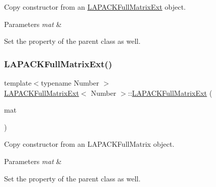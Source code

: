 Copy constructor from an \hyperlink{classLAPACKFullMatrixExt}{L\+A\+P\+A\+C\+K\+Full\+Matrix\+Ext} object. 
\begin{DoxyParams}{Parameters}
{\em mat} & \\
\hline
\end{DoxyParams}
Set the property of the parent class as well.\mbox{\label{classLAPACKFullMatrixExt_adfb752e5770370e4f7ddbd298d873c60}} 
\subsubsection{\texorpdfstring{L\+A\+P\+A\+C\+K\+Full\+Matrix\+Ext()}{LAPACKFullMatrixExt()}\hspace{0.1cm}{\footnotesize\ttfamily [4/10]}}
{\footnotesize\ttfamily template$<$typename Number $>$ \\
\hyperlink{classLAPACKFullMatrixExt}{L\+A\+P\+A\+C\+K\+Full\+Matrix\+Ext}$<$ Number $>$\+::\hyperlink{classLAPACKFullMatrixExt}{L\+A\+P\+A\+C\+K\+Full\+Matrix\+Ext} (\begin{DoxyParamCaption}\item[{const L\+A\+P\+A\+C\+K\+Full\+Matrix$<$ Number $>$ \&}]{mat }\end{DoxyParamCaption})}

Copy constructor from an L\+A\+P\+A\+C\+K\+Full\+Matrix object. 
\begin{DoxyParams}{Parameters}
{\em mat} & \\
\hline
\end{DoxyParams}
Set the property of the parent class as well.\mbox{\label{classLAPACKFullMatrixExt_adcc17e75248175c5d89ba15ee58be954}} 
